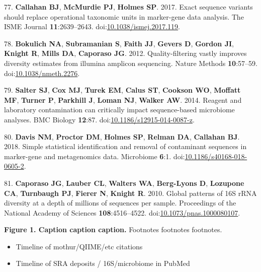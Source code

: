 \documentclass[11pt,]{article}
\providecommand{\tightlist}{%
  \setlength{\itemsep}{0pt}\setlength{\parskip}{0pt}}
\begin{document}
\leavevmode\hypertarget{ref-Callahan2017}{}%
77. \textbf{Callahan BJ}, \textbf{McMurdie PJ}, \textbf{Holmes SP}.
2017. Exact sequence variants should replace operational taxonomic units
in marker-gene data analysis. The ISME Journal \textbf{11}:2639--2643.
doi:\href{https://doi.org/10.1038/ismej.2017.119}{10.1038/ismej.2017.119}.

\leavevmode\hypertarget{ref-Bokulich2012}{}%
78. \textbf{Bokulich NA}, \textbf{Subramanian S}, \textbf{Faith JJ},
\textbf{Gevers D}, \textbf{Gordon JI}, \textbf{Knight R}, \textbf{Mills
DA}, \textbf{Caporaso JG}. 2012. Quality-filtering vastly improves
diversity estimates from illumina amplicon sequencing. Nature Methods
\textbf{10}:57--59.
doi:\href{https://doi.org/10.1038/nmeth.2276}{10.1038/nmeth.2276}.

\leavevmode\hypertarget{ref-Salter2014}{}%
79. \textbf{Salter SJ}, \textbf{Cox MJ}, \textbf{Turek EM},
\textbf{Calus ST}, \textbf{Cookson WO}, \textbf{Moffatt MF},
\textbf{Turner P}, \textbf{Parkhill J}, \textbf{Loman NJ},
\textbf{Walker AW}. 2014. Reagent and laboratory contamination can
critically impact sequence-based microbiome analyses. BMC Biology
\textbf{12}:87.
doi:\href{https://doi.org/10.1186/s12915-014-0087-z}{10.1186/s12915-014-0087-z}.

\leavevmode\hypertarget{ref-Davis2018}{}%
80. \textbf{Davis NM}, \textbf{Proctor DM}, \textbf{Holmes SP},
\textbf{Relman DA}, \textbf{Callahan BJ}. 2018. Simple statistical
identification and removal of contaminant sequences in marker-gene and
metagenomics data. Microbiome \textbf{6}:1.
doi:\href{https://doi.org/10.1186/s40168-018-0605-2}{10.1186/s40168-018-0605-2}.

\leavevmode\hypertarget{ref-Caporaso2010b}{}%
81. \textbf{Caporaso JG}, \textbf{Lauber CL}, \textbf{Walters WA},
\textbf{Berg-Lyons D}, \textbf{Lozupone CA}, \textbf{Turnbaugh PJ},
\textbf{Fierer N}, \textbf{Knight R}. 2010. Global patterns of 16S rRNA
diversity at a depth of millions of sequences per sample. Proceedings of
the National Academy of Sciences \textbf{108}:4516--4522.
doi:\href{https://doi.org/10.1073/pnas.1000080107}{10.1073/pnas.1000080107}.

\newpage

\textbf{Figure 1. Caption caption caption.} Footnotes footnotes
footnotes.

\begin{itemize}
\tightlist
\item
  Timeline of mothur/QIIME/etc citations
\item
  Timeline of SRA deposits / 16S/microbiome in PubMed
\end{itemize}
\end{document}
